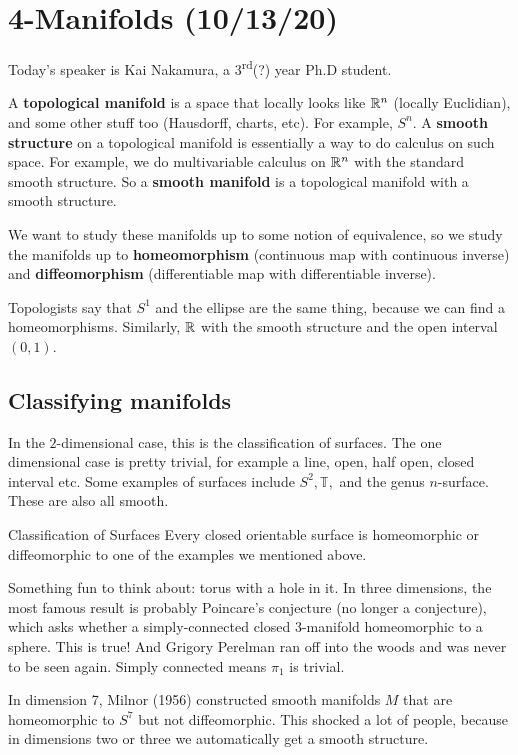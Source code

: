 \section{4-Manifolds (10/13/20)}
Today's speaker is Kai Nakamura, a 3\textsuperscript{rd}(?) year Ph.D student. 
\begin{definition}[Manifolds]
    A \textbf{topological manifold} is a space that locally looks like $\mathbb{R}^n $ (locally Euclidian), and some other stuff too (Hausdorff, charts, etc). For example, $S^n $. A \textbf{smooth structure} on a topological manifold is essentially a way to do calculus on such space. For example, we do multivariable calculus on $\mathbb{R}^n $ with the standard smooth structure. So a \textbf{smooth manifold} is a topological manifold with a smooth structure.
\end{definition}
We want to study these manifolds up to some notion of equivalence, so we study the manifolds up to \textbf{homeomorphism} (continuous map with continuous inverse) and \textbf{diffeomorphism} (differentiable map with differentiable inverse).
\begin{example}
    Topologists say that $S^1 $ and the ellipse are the same thing, because we can find a homeomorphisms. Similarly, $\mathbb{R}$ with the smooth structure and the open interval $(0,1)$.
\end{example}
\subsection{Classifying manifolds}
In the $2$-dimensional case, this is the classification of surfaces. The one dimensional case is pretty trivial, for example a line, open, half open, closed interval etc. Some examples of surfaces include $S^2, \mathbb{T},$ and the genus $n$-surface. These are also all smooth.
\begin{namedthm}{Classification of Surfaces}
   Every closed orientable surface is homeomorphic or diffeomorphic to one of the examples we mentioned above. 
\end{namedthm}
Something fun to think about: torus with a hole in it. In three dimensions, the most famous result is probably Poincare's conjecture (no longer a conjecture), which asks whether a simply-connected closed $3$-manifold homeomorphic to a sphere. This is true! And Grigory Perelman ran off into the woods and was never to be seen again. Simply connected means $\pi_1$ is trivial.

In dimension 7, Milnor (1956) constructed smooth manifolds $M$ that are homeomorphic to $S^7$ but not diffeomorphic. This shocked a lot of people, because in dimensions two or three we automatically get a smooth structure.

